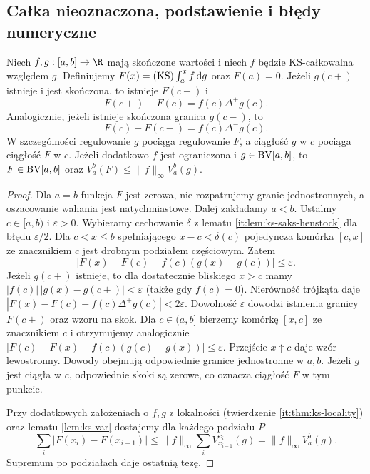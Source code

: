 \subsection*{Całka nieoznaczona, podstawienie i błędy numeryczne}
\begin{twierdzenie}
\label{tw:ks-primitive}
Niech $f,g:[a,b]\to\R$ mają skończone wartości i niech
$f$ będzie KS-całkowalna względem $g$. Definiujemy
$F(x)=(\mathrm{KS})\int_a^x f\,\mathrm dg$ oraz $F(a)=0$.
Jeżeli $g(c+)$ istnieje i jest skończona, to istnieje
$F(c+)$ i
\[
 F(c+)-F(c)=f(c)\Delta^+g(c).
\]
Analogicznie, jeżeli istnieje skończona granica $g(c-)$, to
\[
 F(c)-F(c-)=f(c)\Delta^-g(c).
\]
W szczególności regulowanie $g$ pociąga regulowanie $F$,
a ciągłość $g$ w $c$ pociąga ciągłość $F$ w $c$.
Jeżeli dodatkowo $f$ jest ograniczona i $g\in\mathrm{BV}[a,b]$, to
$F\in\mathrm{BV}[a,b]$ oraz $V_a^b(F)\le\|f\|_\infty V_a^b(g)$.
\end{twierdzenie}
\begin{proof}
Dla $a=b$ funkcja $F$ jest zerowa, nie rozpatrujemy
granic jednostronnych, a oszacowanie wahania jest
natychmiastowe. Dalej zakładamy $a<b$.
Ustalmy $c\in[a,b)$ i $\varepsilon>0$. Wybieramy cechowanie
$\delta$ z lematu \ref{it:lem:ks-saks-henstock} dla błędu
$\varepsilon/2$. Dla $c<x\le b$ spełniającego
$x-c<\delta(c)$ pojedyncza komórka $[c,x]$ ze znacznikiem
$c$ jest drobnym podziałem częściowym. Zatem
\[
 |F(x)-F(c)-f(c)(g(x)-g(c))|\le\varepsilon.
\]
Jeżeli $g(c+)$ istnieje, to dla dostatecznie bliskiego $x>c$
mamy $|f(c)|\,|g(x)-g(c+)|<\varepsilon$ (także gdy $f(c)=0$).
Nierówność trójkąta daje
$|F(x)-F(c)-f(c)\Delta^+g(c)|<2\varepsilon$.
Dowolność $\varepsilon$ dowodzi istnienia granicy $F(c+)$
oraz wzoru na skok. Dla $c\in(a,b]$ bierzemy komórkę $[x,c]$
ze znacznikiem $c$ i otrzymujemy analogicznie
$|F(c)-F(x)-f(c)(g(c)-g(x))|\le\varepsilon$.
Przejście $x\uparrow c$ daje wzór lewostronny. Dowody
obejmują odpowiednie granice jednostronne w $a,b$.
Jeżeli $g$ jest ciągła w $c$, odpowiednie skoki są zerowe,
co oznacza ciągłość $F$ w tym punkcie.

Przy dodatkowych założeniach o $f,g$ z lokalności
(twierdzenie \ref{it:thm:ks-locality}) oraz lematu
\ref{lem:ks-var} dostajemy dla każdego podziału $P$
\[
 \sum_i|F(x_i)-F(x_{i-1})|
 \le\|f\|_\infty\sum_i V_{x_{i-1}}^{x_i}(g)
 =\|f\|_\infty V_a^b(g).
\]
Supremum po podziałach daje ostatnią tezę.
\end{proof}

